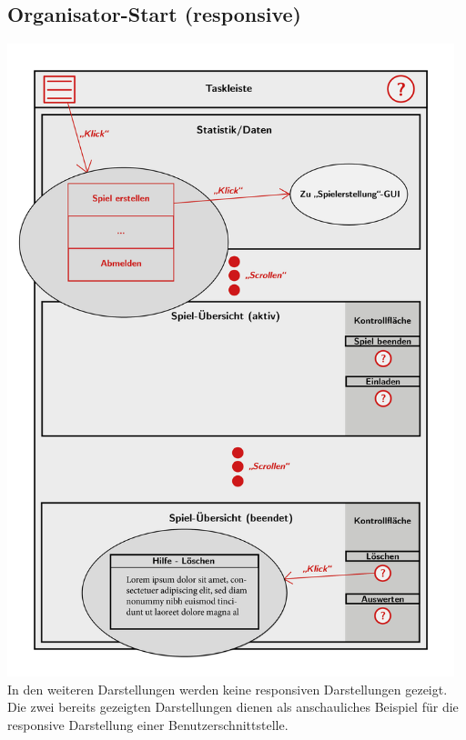 \documentclass[a4paper]{scrreprt}
\begin{document}
    \subsection{Organisator-Start (responsive)}
    \centering
    \includegraphics[width=13cm]{../pictures/3_Organisator(responsive).jpg}\\
    In den weiteren Darstellungen werden keine responsiven Darstellungen gezeigt.
    Die zwei bereits gezeigten Darstellungen dienen als anschauliches Beispiel für
    die responsive Darstellung einer Benutzerschnittstelle.
\end{document}
